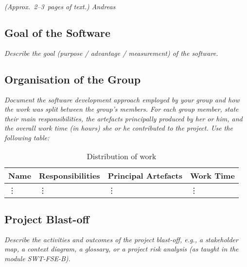 \flushleft
\emph{(Approx.~2--3~pages of text.)
Andreas}

\subsection{Goal of the Software}

\emph{Describe the goal (purpose / advantage / measurement) of the software.}

\subsection{Organisation of the Group}

\emph{Document the software development approach employed by your group and how 
the work was split between the group's members. For each group member, state 
their main responsibilities, the artefacts principally produced by her or him, 
and the overall work time (in hours) she or he contributed to the project. Use 
the following table:}

\begin{table}[!h]
  \caption{Distribution of work}
  \centering
  \begin{tabular}{l||l|l|l|}
    Name & Responsibilities & Principal Artefacts & Work Time\\
    \hline
    \vdots&\vdots&\vdots&\vdots\\
  \end{tabular}
\end{table}

\subsection{Project Blast-off}

\emph{Describe the activities and outcomes of the project blast-off, e.g., a 
stakeholder map, a context diagram, a glossary, or a project risk analysis (as 
taught in the  module SWT-FSE-B).}

